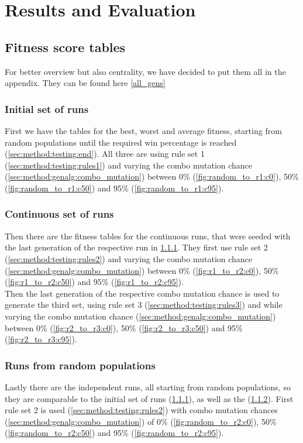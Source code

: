 \chapter{Results and Evaluation}
\label{ch:results}
\section{Fitness score tables} %
\label{ch:results:fit}
For better overview but also centrality, we have decided to put them all in the appendix. They can be found here \ref{all_gens}

\subsection{Initial set of runs}
\label{ch:results:fit:init}
First we have the tables for the best, worst and average fitness, starting from random populations until the required win percentage is reached (\ref{sec:method:testing:end}). All three are using rule set 1 (\ref{sec:method:testing:rules1}) and varying the combo mutation chance (\ref{sec:method:genalg:combo_mutation}) between 0\% (\ref{fig:random_to_r1:c0}), 50\% (\ref{fig:random_to_r1:c50}) and 95\% (\ref{fig:random_to_r1:c95}). \\

\subsection{Continuous set of runs}
\label{ch:results:fit:cont}
Then there are the fitness tables for the continuous runs, that were seeded with the last generation of the respective run in \ref{ch:results:fit:init}. They first use rule set 2 (\ref{sec:method:testing:rules2}) and varying the combo mutation chance (\ref{sec:method:genalg:combo_mutation}) between 0\% (\ref{fig:r1_to_r2:c0}), 50\% (\ref{fig:r1_to_r2:c50}) and 95\% (\ref{fig:r1_to_r2:c95}).  \\

Then the last generation of the respective combo mutation chance is used to generate the third set, using rule set 3 (\ref{sec:method:testing:rules3}) and while varying the combo mutation chance (\ref{sec:method:genalg:combo_mutation}) between 0\% (\ref{fig:r2_to_r3:c0}), 50\% (\ref{fig:r2_to_r3:c50}) and 95\% (\ref{fig:r2_to_r3:c95}). \\


\subsection{Runs from random populations}
\label{ch:results:fit:rand}
Lastly there are the independent runs, all starting from random populations, so they are comparable to the initial set of runs (\ref{ch:results:fit:init}), as well as the (\ref{ch:results:fit:cont}). First rule set 2 is used (\ref{sec:method:testing:rules2}) with combo mutation chances (\ref{sec:method:genalg:combo_mutation}) of 0\% (\ref{fig:random_to_r2:c0}), 50\% (\ref{fig:random_to_r2:c50}) and 95\% (\ref{fig:random_to_r2:c95}). \\

